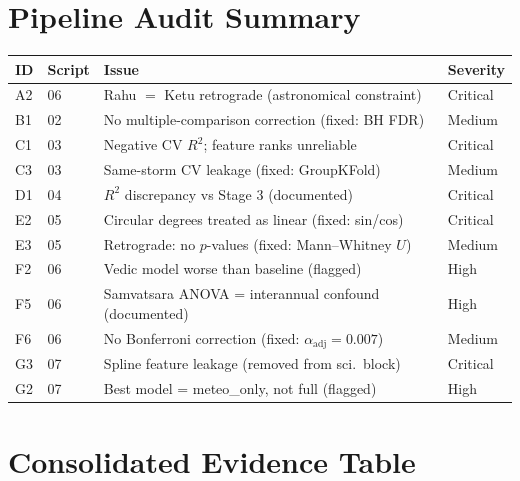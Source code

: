 \documentclass[12pt,a4paper]{article}
\begin{document}
\section{Pipeline Audit Summary}
\label{app:audit}

\begin{center}
\small
\begin{tabular}{llll}
  \toprule
  \textbf{ID} & \textbf{Script} & \textbf{Issue} & \textbf{Severity} \\
  \midrule
  A2 & 06 & Rahu $=$ Ketu retrograde (astronomical constraint) & Critical \\
  B1 & 02 & No multiple-comparison correction (fixed: BH FDR) & Medium \\
  C1 & 03 & Negative CV $R^2$; feature ranks unreliable & Critical \\
  C3 & 03 & Same-storm CV leakage (fixed: GroupKFold) & Medium \\
  D1 & 04 & $R^2$ discrepancy vs Stage 3 (documented) & Critical \\
  E2 & 05 & Circular degrees treated as linear (fixed: sin/cos) & Critical \\
  E3 & 05 & Retrograde: no $p$-values (fixed: Mann--Whitney $U$) & Medium \\
  F2 & 06 & Vedic model worse than baseline (flagged) & High \\
  F5 & 06 & Samvatsara ANOVA = interannual confound (documented) & High \\
  F6 & 06 & No Bonferroni correction (fixed: $\alpha_{\text{adj}} = 0.007$) & Medium \\
  G3 & 07 & Spline feature leakage (removed from sci.\ block) & Critical \\
  G2 & 07 & Best model = meteo\_only, not full (flagged) & High \\
  \bottomrule
\end{tabular}
\end{center}

\section{Consolidated Evidence Table}
\label{app:evidence}
\end{document}
